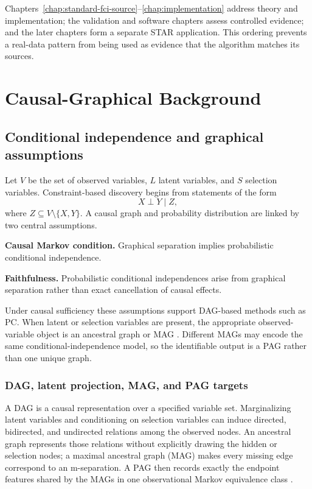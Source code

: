 \documentclass[11pt,a4paper,oneside]{report}
\begin{document}
Chapters~\ref{chap:standard-fci-source}--\ref{chap:implementation} address
theory and implementation; the validation and software chapters assess
controlled evidence; and the later chapters form a separate STAR
application.  This ordering prevents a real-data pattern from being used as
evidence that the algorithm matches its sources.

\chapter{Causal-Graphical Background}

\section{Conditional independence and graphical assumptions}

Let \(V\) be the set of observed variables, \(L\) latent variables, and \(S\)
selection variables. Constraint-based discovery begins from statements of the
form
\[
  X \perp Y \mid Z,
\]
where \(Z\subseteq V\setminus\{X,Y\}\). A causal graph and probability
distribution are linked by two central assumptions.

\textbf{Causal Markov condition.} Graphical separation implies probabilistic
conditional independence.

\textbf{Faithfulness.} Probabilistic conditional independences arise from
graphical separation rather than exact cancellation of causal effects.

Under causal sufficiency these assumptions support DAG-based methods such as
PC. When latent or selection variables are present, the appropriate
observed-variable object is an ancestral graph or MAG
\citep{richardson2002ancestral}. Different MAGs may encode the same
conditional-independence model, so the identifiable output is a PAG rather
than one unique graph.

\subsection{DAG, latent projection, MAG, and PAG targets}

A DAG is a causal representation over a specified variable set.  Marginalizing
latent variables and conditioning on selection variables can induce directed,
bidirected, and undirected relations among the observed nodes.  An ancestral
graph represents those relations without explicitly drawing the hidden or
selection nodes; a maximal ancestral graph (MAG) makes every missing edge
correspond to an m-separation.  A PAG then records exactly the endpoint
features shared by the MAGs in one observational Markov equivalence class
\citep{richardson2002ancestral,zhang2008completeness}.
\end{document}
